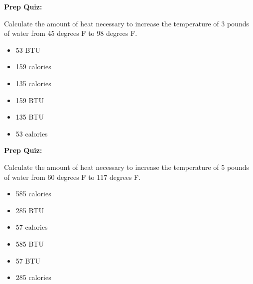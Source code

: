 \vfil \eject

\noindent
{\bf Prep Quiz:}

Calculate the amount of heat necessary to increase the temperature of 3 pounds of water from 45 degrees F to 98 degrees F.

\begin{itemize}
\item{} 53 BTU
\vskip 5pt 
\item{} 159 calories
\vskip 5pt 
\item{} 135 calories
\vskip 5pt 
\item{} 159 BTU
\vskip 5pt 
\item{} 135 BTU
\vskip 5pt 
\item{} 53 calories
\end{itemize}















\vfil \eject

\noindent
{\bf Prep Quiz:}

Calculate the amount of heat necessary to increase the temperature of 5 pounds of water from 60 degrees F to 117 degrees F.

\begin{itemize}
\item{} 585 calories
\vskip 5pt 
\item{} 285 BTU
\vskip 5pt 
\item{} 57 calories
\vskip 5pt 
\item{} 585 BTU
\vskip 5pt 
\item{} 57 BTU
\vskip 5pt 
\item{} 285 calories
\end{itemize}




